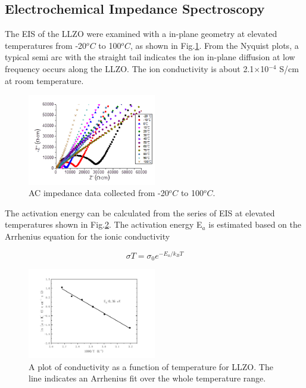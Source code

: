 \documentclass[twoside,twocolumn,9pt]{article}
\begin{document}
\subsection{Electrochemical Impedance Spectroscopy}

The EIS of the LLZO were examined with a in-plane geometry at elevated temperatures from -20$^oC$ to 100$^oC$, as shown in  Fig.\ref{fig:impedance}. 
From the Nyquist plots, a typical semi arc with the straight tail indicates the ion in-plane diffusion at low frequency occurs along the LLZO. 
The ion conductivity is about 2.1$\times$10$^{-4}$ S/cm at room temperature.

\begin{figure}
\centering
\includegraphics[width=0.5\textwidth]{Pics/impedance.png}
\caption{AC impedance data collected from -20$^oC$ to 100$^oC$.}
\label{fig:impedance}
\end{figure}

The activation energy can be calculated from the series of EIS at elevated temperatures shown in Fig.\ref{fig:arrhenius-plot}.
The activation energy E$_a$ is estimated based on the Arrhenius equation for the ionic conductivity

\begin{equation}
\sigma T = \sigma_0 e^{-E_a/k_B T}
\end{equation}


\begin{figure}
\centering
\includegraphics[width=0.5\textwidth]{Pics/arrhenius-plot.png}
\caption{A plot of conductivity as a function of temperature for LLZO. The line indicates an Arrhenius fit over the whole temperature range.}
\label{fig:arrhenius-plot}
\end{figure}
\end{document}
